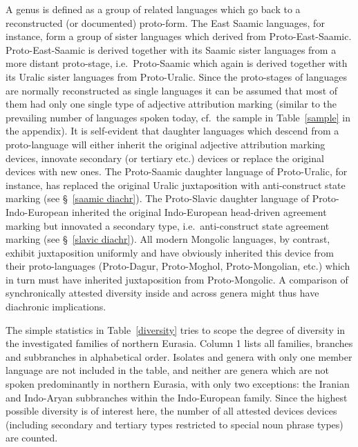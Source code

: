 A genus is defined as a group of related languages which go back to a reconstructed (or documented) proto-form. The East Saamic languages, for instance, form a group of sister languages which derived from Proto-East-Saamic. Proto-East-Saamic is derived together with its Saamic sister languages from a more distant proto-stage, i.e.~Proto-Saamic which again is derived together with its Uralic sister languages from Proto-Uralic. Since the proto-stages of languages are normally reconstructed as single languages it can be assumed that most of them had only one single type of adjective attribution marking (similar to the prevailing number of languages spoken today, cf.~the sample in Table~\ref{sample} in the appendix). It is self-evident that daughter languages which descend from a proto-language will either inherit the original adjective attribution marking devices, innovate secondary (or tertiary etc.) devices or replace the original devices with new ones. The Proto-Saamic daughter language of Proto-Uralic, for instance, has replaced the original Uralic juxtaposition with anti-construct state marking (see \S~\ref{saamic diachr}). The Proto-Slavic daughter language of Proto-Indo-European inherited the original Indo-European head-driven agreement marking but innovated a secondary type, i.e.~anti-construct state agreement marking (see \S~\ref{slavic diachr}). All modern Mongolic languages, by contrast, exhibit juxtaposition uniformly and have obviously inherited this device from their proto-languages (Proto-Dagur, Proto-Moghol, Proto-Mongolian, etc.) which in turn must have inherited juxtaposition from Proto-Mongolic. A comparison of synchronically attested diversity inside and across genera might thus have diachronic implications.

The simple statistics in Table~\ref{diversity} tries to scope the degree of diversity in the investigated families of northern Eurasia. Column 1 lists all families, branches and subbranches in alphabetical order. Isolates and genera with only one member language are not included in the table, and neither are genera which are not spoken predominantly in northern Eurasia, with only two exceptions: the Iranian and Indo-Aryan subbranches within the Indo-European family. Since the highest possible diversity is of interest here, the number of all attested devices devices (including secondary and tertiary types restricted to special noun phrase types) are counted. 

